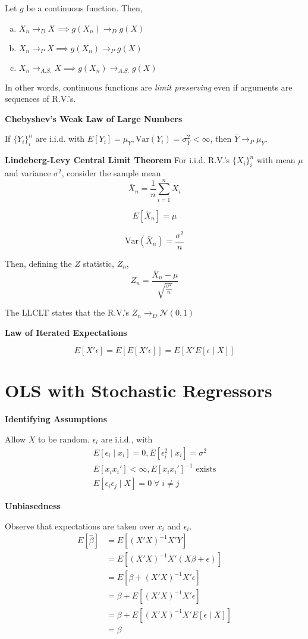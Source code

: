 \documentclass[16pt]{article}
\newcommand{\bh}{\hat{\beta}}
\newcommand{\norm}{\mathcal{N}}
\newcommand{\Var}{\text{Var}}
\begin{document}
Let $g$ be a continuous function. Then,

\begin{enumerate}[(a)]
  \item $X_n \to_D X \implies g(X_n) \to_D g(X)$
  \item $X_n \to_P X \implies g(X_n) \to_P g(X)$
  \item $X_n \to_{A.S.} X \implies g(X_n) \to_{A.S.} g(X)$
\end{enumerate}

In other words, continuous functions are \emph{limit preserving} even if arguments are sequences of R.V.'s.

\textbf{Chebyshev's Weak Law of Large Numbers}

If $\{Y_i\}_i^n$ are i.i.d. with $E[Y_i] = \mu_Y, \Var(Y_i) = \sigma_Y^2 < \infty$, then $\bar{Y} \to_P \mu_Y$.

\textbf{Lindeberg-Levy Central Limit Theorem}
For i.i.d. R.V.'s $\{X_i\}_i^n$ with mean $\mu$ and variance $\sigma^2$, consider the sample mean
$$\bar{X}_n = \frac{1}{n} \sum_{i=1}^n X_i$$

$$E[\bar{X}_n] = \mu$$

$$\Var(\bar{X}_n) = \frac{\sigma^2}{n}$$

Then, defining the $Z$ statistic, $Z_n$,
$$Z_n = \frac{\bar{X}_n - \mu}{\sqrt{\frac{\sigma^2}{n}}}$$

The LLCLT states that the R.V.'s $Z_n \to_D \norm(0,1)$

\textbf{Law of Iterated Expectations}

$$E[X' \epsilon] = E[E[X' \epsilon]] = E[X' E[\epsilon \mid X]]$$

\section*{OLS with Stochastic Regressors}

\textbf{Identifying Assumptions}

Allow $X$ to be random. $\epsilon_i$ are i.i.d., with
\begin{align*}
  E[\epsilon_i\mid x_i] = 0, E[\epsilon_i^2\mid x_i] = \sigma^2\\
  E[x_i x_i'] < \infty, E[x_i x_i']^{-1} \text{ exists}\\
  E[\epsilon_i \epsilon_j \mid X] = 0\;\forall\; i \neq j
\end{align*}

\textbf{Unbiasedness}

Observe that expectations are taken over $x_i$ and $\epsilon_i$.
\begin{align*}
  E[\bh] &= E[(X'X)^{-1}X'Y]\\
    &= E[(X'X)^{-1}X'(X\beta + \epsilon)]\\
    &= E[\beta + (X'X)^{-1}X'\epsilon]\\
    &= \beta + E[(X'X)^{-1} X'\epsilon]\\
    &= \beta + E[(X'X)^{-1}X'E[\epsilon\mid X]]\\
    &= \beta
\end{align*}
\end{document}
